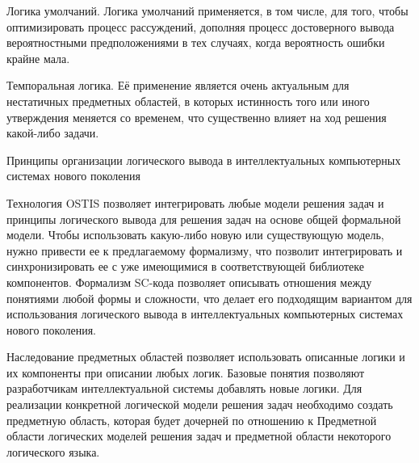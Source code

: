 \begin{frame}{}
\topline
\justifying
\vspace{10mm}

    \begin{textitemize}
        \item Логика умолчаний. Логика умолчаний применяется, в том числе, для того, чтобы оптимизировать процесс рассуждений, дополняя процесс достоверного вывода вероятностными предположениями в тех случаях, когда вероятность ошибки крайне мала. 
        \item Темпоральная логика. Её применение является очень актуальным для нестатичных предметных областей, в которых истинность того или иного утверждения меняется со временем, что существенно влияет на ход решения какой-либо задачи.      
    \end{textitemize}  
\end{frame}


\begin{frame}{\large Принципы организации логического вывода в интеллектуальных компьютерных системах нового поколения}
\topline
\justifying
\vspace{10mm}
     
    Технология OSTIS позволяет интегрировать любые модели решения задач и принципы логического вывода для решения задач на основе общей формальной модели. Чтобы использовать какую-либо новую или существующую модель, нужно привести ее к предлагаемому формализму, что позволит интегрировать и синхронизировать ее с уже имеющимися в соответствующей библиотеке компонентов. Формализм SC-кода позволяет описывать отношения между понятиями любой формы и сложности, что делает его подходящим вариантом для использования логического вывода в интеллектуальных компьютерных системах нового поколения.
    
    Наследование предметных областей позволяет использовать описанные логики и их компоненты при описании любых логик. Базовые понятия позволяют разработчикам интеллектуальной системы добавлять новые логики. Для реализации конкретной логической модели решения задач необходимо создать предметную область, которая будет дочерней по отношению к Предметной области логических моделей решения задач и предметной области некоторого логического языка.
\end{frame}

